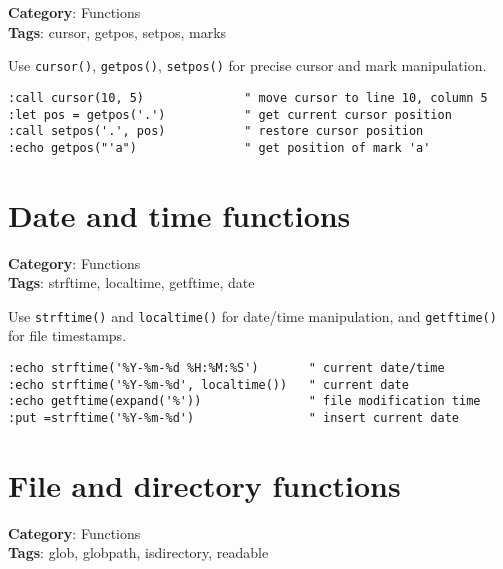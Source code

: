 \textbf{Category}: Functions\\ \textbf{Tags}: cursor, getpos, setpos, marks
\vspace{0.5cm}

Use {\footnotesize \Verb§cursor()§}, {\footnotesize \Verb§getpos()§}, {\footnotesize \Verb§setpos()§} for precise cursor and mark manipulation.

\begin{Exa*}{}
\begin{Verbatim}[fontsize=\footnotesize, breaklines, breakanywhere]
:call cursor(10, 5)              " move cursor to line 10, column 5
:let pos = getpos('.')           " get current cursor position
:call setpos('.', pos)           " restore cursor position
:echo getpos("'a")               " get position of mark 'a'
\end{Verbatim}
\end{Exa*}

\section{Date and time functions}

\textbf{Category}: Functions\\ \textbf{Tags}: strftime, localtime, getftime, date
\vspace{0.5cm}

Use {\footnotesize \Verb§strftime()§} and {\footnotesize \Verb§localtime()§} for date/time manipulation, and {\footnotesize \Verb§getftime()§} for file timestamps.

\begin{Exa*}{}
\begin{Verbatim}[fontsize=\footnotesize, breaklines, breakanywhere]
:echo strftime('%Y-%m-%d %H:%M:%S')       " current date/time
:echo strftime('%Y-%m-%d', localtime())   " current date
:echo getftime(expand('%'))               " file modification time
:put =strftime('%Y-%m-%d')                " insert current date
\end{Verbatim}
\end{Exa*}

\section{File and directory functions}

\textbf{Category}: Functions\\ \textbf{Tags}: glob, globpath, isdirectory, readable
\vspace{0.5cm}

